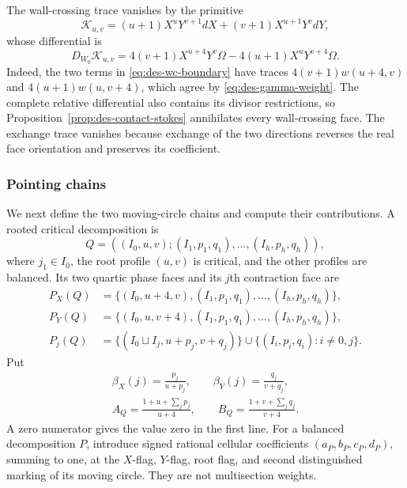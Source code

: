 The wall-crossing trace vanishes by the primitive
\begin{equation}
 \mathcal K_{u,v}=(u+1)X^uY^{v+1}dX+(v+1)X^{u+1}Y^vdY,
 \label{eq:des-wc-primitive}
\end{equation}
whose differential is
\begin{equation}
 D_{W_0}\mathcal K_{u,v}
 =4(v+1)X^{u+4}Y^v\Omega-4(u+1)X^uY^{v+4}\Omega.
 \label{eq:des-wc-boundary}
\end{equation}
Indeed, the two terms in \eqref{eq:des-wc-boundary} have traces
$4(v+1)w(u+4,v)$ and $4(u+1)w(u,v+4)$, which agree by
\eqref{eq:des-gamma-weight}.  The complete relative differential also
contains its divisor restrictions, so Proposition~\ref{prop:des-contact-stokes}
annihilates every wall-crossing face.  The exchange trace vanishes because exchange of the
two directions reverses the real face orientation and preserves its
coefficient.

\subsubsection{Pointing chains}

We next define the two moving-circle chains and compute their contributions.
A rooted critical decomposition is
\[
 Q=((I_0,u,v);(I_1,p_1,q_1),\ldots,(I_h,p_h,q_h)),
\]
where $j_1\in I_0$, the root profile $(u,v)$ is critical, and the other
profiles are balanced.  Its two quartic phase faces and its $j$th
contraction face are
\begin{equation}
\begin{aligned}
 P_X(Q)&=\{(I_0,u+4,v),(I_1,p_1,q_1),\ldots,(I_h,p_h,q_h)\},\\
 P_Y(Q)&=\{(I_0,u,v+4),(I_1,p_1,q_1),\ldots,(I_h,p_h,q_h)\},\\
 P_j(Q)&=\{(I_0\sqcup I_j,u+p_j,v+q_j)\}
          \cup\{(I_i,p_i,q_i):i\ne0,j\}.
\end{aligned}
 \label{eq:des-pointing-faces}
\end{equation}
Put
\begin{equation}
\begin{gathered}
 \beta_X(j)=\frac{p_j}{u+p_j},\qquad
 \beta_Y(j)=\frac{q_j}{v+q_j},\\
 A_Q=\frac{1+u+\sum_jp_j}{u+4},\qquad
 B_Q=\frac{1+v+\sum_jq_j}{v+4}.
\end{gathered}
 \label{eq:des-pointing-degrees}
\end{equation}
A zero numerator gives the value zero in the first line.  For a balanced
decomposition $P$, introduce signed rational cellular coefficients
$(a_P,b_P,c_P,d_P)$, summing to one, at the $X$-flag, $Y$-flag, root flag,
and second distinguished marking of its moving circle.  They are not
multisection weights.

